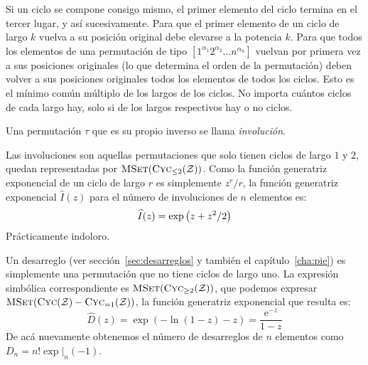   Si un ciclo se compone consigo mismo,
  el primer elemento del ciclo termina en el tercer lugar,
  y así sucesivamente.
  Para que el primer elemento de un ciclo de largo \(k\)
  vuelva a su posición original
  debe elevarse a la potencia \(k\).
  Para que todos los elementos de una permutación
  de tipo \([1^{\alpha_1} 2^{\alpha_2} \dotso n^{\alpha_n}]\)
  vuelvan por primera vez a sus posiciones originales
  (lo que determina el orden de la permutación)%
  deben volver a sus posiciones originales
  todos los elementos de todos los ciclos.
  Esto es el mínimo común múltiplo de los largos de los ciclos.
  No importa cuántos ciclos de cada largo hay,
  solo si de los largos respectivos hay o no ciclos.

  \begin{definition}
    Una permutación \(\tau\)
    que es su propio inverso se llama \emph{involución}.
  \end{definition}

  Las involuciones son aquellas permutaciones que solo tienen ciclos
  de largo \(1\) y \(2\),
  quedan representadas
  por \(\operatorname{\textsc{MSet}}(\operatorname{\textsc{Cyc}}_{\le 2}(\mathcal{Z}))\).%
  Como la función generatriz exponencial de un ciclo de largo \(r\)
  es simplemente \(z^r / r\),
  la función generatriz exponencial \(\widehat{I}(z)\)
  para el número de involuciones de \(n\) elementos es:
  \begin{equation}
    \label{eq:involution-egf}
    \index{involucion@involución!funcion generatriz@función generatriz}
    \widehat{I}(z)
      = \exp\left(
	      z + z^2 / 2
	    \right)
  \end{equation}
  Prácticamente indoloro.

  Un desarreglo%
  (ver sección~\ref{sec:desarreglos}
   y también el capítulo~\ref{cha:pie})
  es simplemente una permutación
  que no tiene ciclos de largo uno.
  La expresión simbólica correspondiente%
  es \(\operatorname{\textsc{MSet}}(\operatorname{\textsc{Cyc}}_{\ge 2}(\mathcal{Z}))\),
  que podemos expresar
    \(\operatorname{\textsc{MSet}}(\operatorname{\textsc{Cyc}}(\mathcal{Z}) - \operatorname{\textsc{Cyc}}_{= 1}(\mathcal{Z}))\),
  la función generatriz exponencial que resulta es:%
  \begin{equation*}
    \widehat{D}(z)
      = \exp ( -\ln (1 - z) - z )
      = \frac{\mathrm{e}^{-z}}{1 - z}
  \end{equation*}
  De acá nuevamente obtenemos
  el número de desarreglos de \(n\) elementos
  como \(D_n = n! \exp\lvert_n (-1)\).

